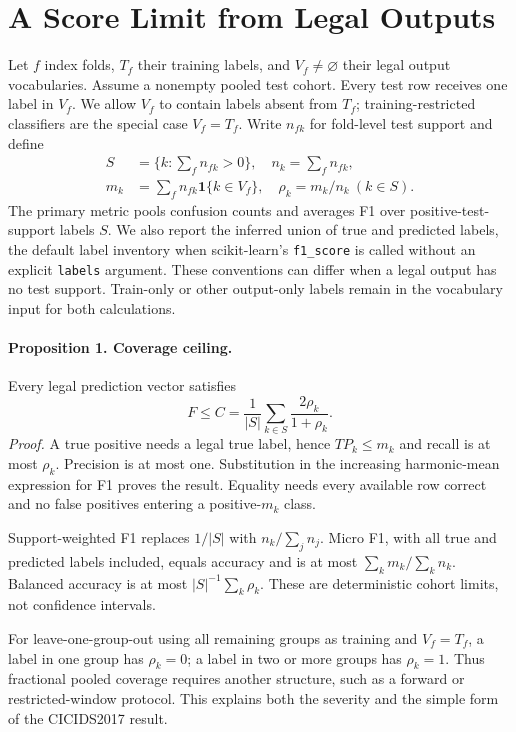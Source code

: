 \documentclass[namedate,webpdf,contemporary,large]{TBench-template}
\begin{document}
\section{A Score Limit from Legal Outputs}
Let \(f\) index folds, \(T_f\) their training labels, and \(V_f\ne\varnothing\) their legal output vocabularies. Assume a nonempty pooled test cohort. Every test row receives one label in \(V_f\). We allow \(V_f\) to contain labels absent from \(T_f\); training-restricted classifiers are the special case \(V_f=T_f\). Write \(n_{fk}\) for fold-level test support and define
\[
\begin{aligned}
S&=\{k:\textstyle\sum_f n_{fk}>0\},\quad n_k=\sum_f n_{fk},\\
m_k&=\sum_fn_{fk}\mathbf{1}\{k\in V_f\},\quad \rho_k=m_k/n_k\ (k\in S).
\end{aligned}
\]
The primary metric pools confusion counts and averages F1 over positive-test-support labels \(S\). We also report the inferred union of true and predicted labels, the default label inventory when scikit-learn's \texttt{f1\_score} is called without an explicit \texttt{labels} argument. These conventions can differ when a legal output has no test support. Train-only or other output-only labels remain in the vocabulary input for both calculations.

\paragraph{Proposition 1. Coverage ceiling.}
Every legal prediction vector satisfies
\[
F\le C=\frac{1}{|S|}\sum_{k\in S}\frac{2\rho_k}{1+\rho_k}.
\]
\emph{Proof.} A true positive needs a legal true label, hence \(TP_k\le m_k\) and recall is at most \(\rho_k\). Precision is at most one. Substitution in the increasing harmonic-mean expression for F1 proves the result. Equality needs every available row correct and no false positives entering a positive-\(m_k\) class.

Support-weighted F1 replaces \(1/|S|\) with \(n_k/\sum_jn_j\). Micro F1, with all true and predicted labels included, equals accuracy and is at most \(\sum_km_k/\sum_kn_k\). Balanced accuracy is at most \(|S|^{-1}\sum_k\rho_k\). These are deterministic cohort limits, not confidence intervals.

For leave-one-group-out using all remaining groups as training and \(V_f=T_f\), a label in one group has \(\rho_k=0\); a label in two or more groups has \(\rho_k=1\). Thus fractional pooled coverage requires another structure, such as a forward or restricted-window protocol. This explains both the severity and the simple form of the CICIDS2017 result.
\end{document}
